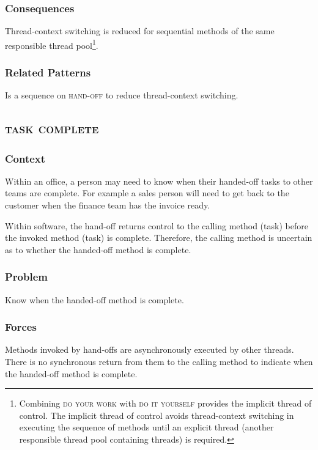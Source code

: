 \documentclass[prodmode]{style/acmlarge}
\begin{document}
\subsubsection*{Consequences} Thread-context switching is reduced for sequential
methods of the same responsible thread pool\footnote{Combining \textsc{do your
work} with \textsc{do it yourself} provides the implicit thread of control.  The
implicit thread of control avoids thread-context switching in executing the
sequence of methods until an explicit thread (another responsible thread pool
containing threads) is required.}.

\subsubsection*{Related Patterns} Is a sequence on \textsc{hand-off} to reduce
thread-context switching.



\subsection{\textsc{\textbf{task complete}}}

\subsubsection*{Context} Within an office, a person may need to know when their
handed-off tasks to other teams are complete.  For example a sales person will
need to get back to the customer when the finance team has the invoice ready.

Within software, the hand-off returns control to the calling method (task)
before the invoked method (task) is complete.  Therefore, the calling method is
uncertain as to whether the handed-off method is complete.

\subsubsection*{\textbf{Problem}} Know when the handed-off method is complete.

\subsubsection*{Forces} Methods invoked by hand-offs are asynchronously executed
by other threads.  There is no synchronous return from them to the calling
method to indicate when the handed-off method is complete.
\end{document}
